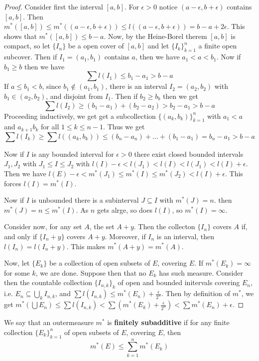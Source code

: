 \begin{proof}
    Consider first the interval $[a,b]$. For $\epsilon>0$  notice
    $(a-\epsilon,b+\epsilon)$ contains $[a,b]$. Then $m^*([a,b]) \leq
    m^*((a-\epsilon,b+\epsilon)) \leq l((a-\epsilon,b+\epsilon))=b-a+2\epsilon$.
    This shows that $m^*([a,b]) \leq b-a$. Now, by the Heine-Borel therem
    $[a,b]$ is compact, so let $\{I_n\}$ be a open cover of $[a,b]$ and let
    $\{I_k\}_{k=1}^{n}$ a finite open subcover. Then if $I_1=(a_1,b_1)$ contains
    $a$, then we have  $a_1<a<b_1$. Now if $b_1 \geq b$ then we have
    \begin{equation*}
        \sum{l(I_1)} \leq b_1-a_1>b-a
    \end{equation*}
    If $a \leq b_1 < b$, since $b_1 \notin (a_1,b_1)$, there is an interval
    $I_2=(a_2,b_2)$ with $b_1 \in (a_2,b_2)$, and disjoint from $I_1$. Then if
    $b_2 \geq b_b$ then we get
    \begin{equation*}
        \sum{l(I_2)} \geq (b_1-a_1)+(b_2-a_2)>b_2-a_1>b-a
    \end{equation*}
    Proceeding inductively, we get get a subcollection $\{(a_k,b_k)\}_{k=1}^n$
    with $a_1<a$ and $a_{k+1}b_k$ for all $1 \leq k \leq n-1$. Thus we get
    \begin{equation*}
        \sum{l(I_k)} \geq \sum{l((a_k,b_k))} \leq (b_n-a_n)+ \dots
        +(b_1-a_1)=b_n-a_1>b-a
    \end{equation*}

    Now if $I$ is any bounded interval for  $\epsilon>0$ there exist closed
    bounded intervals  $J_1,J_2$ with $J_1 \leq I \leq J_2$ with
    $l(I)-\epsilon<l(J_1)<l(I)<l(J_1)<l(I)+\epsilon$. Then we have
    $l(E)-\epsilon<m^*(J_1) \leq m^*(I) \leq m^*(J_2)<l(I)+\epsilon$. This
    forces $l(I)=m^*(I)$.

    Now if $I$ is unbounded there is a subinterval $J \subseteq I$ with
    $m^*(J)=n$. then $m^*(J)=n \leq m^*(I)$. As $n$ gets alrge, so does
    $l(I)$, so $m^*(I)=\infty$.

    Consider now, for any set $A$, the set $A+y$. Then the collecton  $\{I_n\}$
    covers $A$ if, and only if  $\{I_n+y\}$ covers $A+y$. Moreover, if  $I_n$ is
    an interval, then  $l(I_n)=l(I_n+y)$. This makes $m^*(A+y)=m^*(A)$.

    Now, let $\{E_k\}$ be a collection of open subsets of $E$, covering  $E$. If
     $m^*(E_k)=\infty$ for some $k$, we are done. Suppose then that no  $E_k$
     has such measure. Consider then the countable collection  $\{I_{n,k}\}_k$
     of open and bounded initervals covering $E_n$, i.e.  $E_n \subseteq
     \bigcup_{k}{I_{n,k}}$, and $\sum{l(I_{n,k})} \leq
     m^*(E_n)+\frac{\epsilon}{2^n}$. Then by definition of $m^*$, we get
     $m^*(\bigcup{E_n}) \leq
     \sum{l(I_{n,k})}<\sum{(m^*(E_k)+\frac{\epsilon}{2^n})}<\sum{m^*(E_n)}+\epsilon$.
\end{proof}

\begin{definition}
    We say that an outermeasure $m^*$ is  \textbf{finitely subadditive} if for
    any finite collection $\{E_k\}_{k=1}^n$ of open subsets of $E$, covering
    $E$, then
    \begin{equation*}
        m^*(E) \leq \sum_{k=1}^n{m^*(E_k)}
    \end{equation*}
\end{definition}
